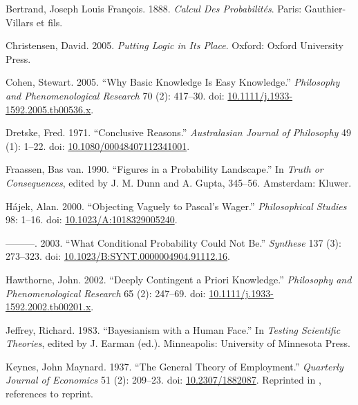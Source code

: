 \documentclass[
  10pt,
  letterpaper,
  DIV=11,
  numbers=noendperiod,
  twoside]{scrartcl}
\newlength{\cslhangindent}
\newenvironment{CSLReferences}[2] %
 {\begin{list}{}{%
  \setlength{\itemindent}{0pt}
  \setlength{\leftmargin}{0pt}
  \setlength{\parsep}{0pt}
  \ifodd #1
   \setlength{\leftmargin}{\cslhangindent}
   \setlength{\itemindent}{-1\cslhangindent}
  \fi
  \setlength{\itemsep}{#2\baselineskip}}}
 {\end{list}}
\begin{document}
\label{refs}
\begin{CSLReferences}{1}{0}
Bertrand, Joseph Louis François. 1888. \emph{Calcul Des Probabilités}.
Paris: Gauthier-Villars et fils.

Christensen, David. 2005. \emph{Putting Logic in Its Place}. Oxford:
Oxford University Press.

Cohen, Stewart. 2005. {``Why Basic Knowledge Is Easy Knowledge.''}
\emph{Philosophy and Phenomenological Research} 70 (2): 417--30. doi:
\href{https://doi.org/10.1111/j.1933-1592.2005.tb00536.x}{10.1111/j.1933-1592.2005.tb00536.x}.

Dretske, Fred. 1971. {``Conclusive Reasons.''} \emph{Australasian
Journal of Philosophy} 49 (1): 1--22. doi:
\href{https://doi.org/10.1080/00048407112341001}{10.1080/00048407112341001}.

Fraassen, Bas van. 1990. {``Figures in a Probability Landscape.''} In
\emph{Truth or Consequences}, edited by J. M. Dunn and A. Gupta,
345--56. Amsterdam: Kluwer.

Hájek, Alan. 2000. {``Objecting Vaguely to Pascal's Wager.''}
\emph{Philosophical Studies} 98: 1--16. doi:
\href{https://doi.org/10.1023/A:1018329005240}{10.1023/A:1018329005240}.

---------. 2003. {``What Conditional Probability Could Not Be.''}
\emph{Synthese} 137 (3): 273--323. doi:
\href{https://doi.org/10.1023/B:SYNT.0000004904.91112.16}{10.1023/B:SYNT.0000004904.91112.16}.

Hawthorne, John. 2002. {``Deeply Contingent a Priori Knowledge.''}
\emph{Philosophy and Phenomenological Research} 65 (2): 247--69. doi:
\href{https://doi.org/10.1111/j.1933-1592.2002.tb00201.x}{10.1111/j.1933-1592.2002.tb00201.x}.

Jeffrey, Richard. 1983. {``Bayesianism with a Human Face.''} In
\emph{Testing Scientific Theories}, edited by J. Earman (ed.).
Minneapolis: University of Minnesota Press.

Keynes, John Maynard. 1937. {``The General Theory of Employment.''}
\emph{Quarterly Journal of Economics} 51 (2): 209--23. doi:
\href{https://doi.org/10.2307/1882087}{10.2307/1882087}. Reprinted in
\cite[XIV 109-123]{KeynesCW}, references to reprint.


\end{CSLReferences}
\end{document}
